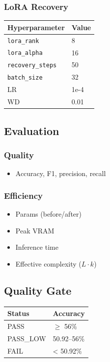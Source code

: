 \subsubsection{LoRA Recovery}

\begin{table}[H]
\centering
\small
\begin{tabular}{ll}
\toprule
\textbf{Hyperparameter} & \textbf{Value} \\
\midrule
\texttt{lora\_rank} & 8 \\
\texttt{lora\_alpha} & 16 \\
\texttt{recovery\_steps} & 50 \\
\texttt{batch\_size} & 32 \\
LR & 1e-4 \\
WD & 0.01 \\
\bottomrule
\end{tabular}
\end{table}

\subsection{Evaluation}

\subsubsection{Quality}
\begin{itemize}
\item Accuracy, F1, precision, recall

\end{itemize}
\subsubsection{Efficiency}
\begin{itemize}
\item Params (before/after)
\item Peak VRAM
\item Inference time
\item Effective complexity ($L \cdot k$)

\end{itemize}
\subsection{Quality Gate}

\begin{table}[H]
\centering
\small
\begin{tabular}{ll}
\toprule
\textbf{Status} & \textbf{Accuracy} \\
\midrule
PASS & $\ge$ 56\% \\
PASS\_LOW & 50.92--56\% \\
FAIL & \textless{} 50.92\% \\
\bottomrule
\end{tabular}
\end{table}


